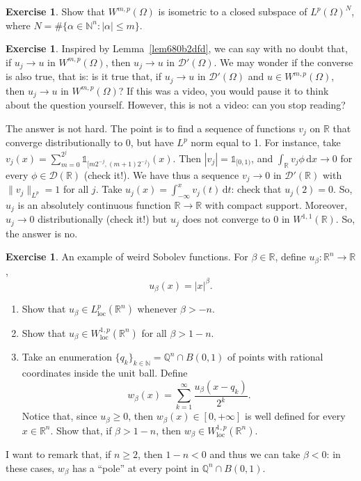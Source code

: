 \documentclass[a4paper,9pt]{amsart}
\newcommand{\scr}[1]{\mathscr{#1}}
\newcommand{\N}{\mathbb{N}}	%
\newcommand{\Q}{\mathbb{Q}}	%
\newcommand{\R}{\mathbb{R}}	%
\newcommand{\did}{\,\mathrm{d}}	%
\newcommand{\loc}{\mathrm{loc}}
\newcommand{\one}{{\mathds 1\!}}
\theoremstyle{plain}
\theoremstyle{definition}
\newtheorem{exercise}[proposition]{Exercise}%
\theoremstyle{remark}
\begin{document}
\begin{exercise}
	Show that $W^{m,p}(\Omega)$ is isometric to a closed subspace of $L^p(\Omega)^N$, where $N=\#\{\alpha\in\N^n:|\alpha|\le m\}$.
\end{exercise}

\begin{exercise}\label{ex680b37f5}
	Inspired by Lemma~\ref{lem680b2dfd}, we can say with no doubt that, if $u_j\to u$ in $W^{m,p}(\Omega)$, then $u_j\to u$ in $\scr D'(\Omega)$.
	We may wonder if the converse is also true, that is:
	is it true that, if $u_j\to u$ in $\scr D'(\Omega)$ and $u\in W^{m,p}(\Omega)$,
	then $u_j\to u$ in $W^{m,p}(\Omega)$?
	If this was a video, you would pause it to think about the question yourself.
	However, this is not a video: can you stop reading?
	
	The answer is not hard. The point is to find a sequence of functions $v_j$ on $\R$ that converge distributionally to $0$, but have $L^p$ norm equal to 1.
	For instance, take $v_j(x) = \sum_{m=0}^{2^j} \one_{[m2^{-j},(m+1)2^{-j})}(x)$.
	Then $|v_j| = \one_{[0,1)}$, and $\int_\R v_j\phi\did x\to0$ for every $\phi\in\scr D(\R)$ (check it!).
	We have thus a sequence $v_j\to 0$ in $\scr D'(\R)$ with $\|v_j\|_{L^p}=1$ for all $j$.
	Take $u_j(x) = \int_{-\infty}^x v_j(t)\did t$: check that $u_j(2)=0$.
	So, $u_j$ is an absolutely continuous function $\R\to\R$ with compact support.
	Moreover, $u_j\to 0$ distributionally (check it!) but $u_j$ does not converge to $0$ in $W^{1,1}(\R)$.
	So, the answer is no.
\end{exercise}

\begin{exercise}\label{ex681772db}
	An example of weird Sobolev functions.
	For $\beta\in\R$, define $u_\beta:\R^n\to\R$,
	\begin{equation}
		u_\beta(x) = |x|^\beta .
	\end{equation}
	\begin{enumerate}[leftmargin=*]
	\item
	Show that $u_\beta\in L^p_\loc(\R^n)$ whenever $\beta>-n$.
	\item
	Show that $u_\beta\in W^{1,p}_\loc(\R^n)$ for all $\beta>1-n$.
	\item
	Take an enumeration $\{q_k\}_{k\in\N} = \Q^n\cap B(0,1)$ of points with rational coordinates inside the unit ball.
	Define
	\begin{equation}
		w_\beta(x) = \sum_{k=1}^\infty \frac{u_\beta(x-q_k)}{2^k} .
	\end{equation}
	Notice that, since $u_\beta\ge0$, then $w_\beta(x) \in[0,+\infty]$ is well defined for every $x\in\R^n$.
	Show that, if $\beta>1-n$, then $w_\beta\in W^{1,p}_\loc(\R^n)$.
	\end{enumerate}
	I want to remark that, if $n\ge2$, then $1-n<0$ and thus we can take $\beta<0$:
	in these cases, $w_\beta$ has a ``pole'' at every point in $\Q^n\cap B(0,1)$.
\end{exercise}
\end{document}
